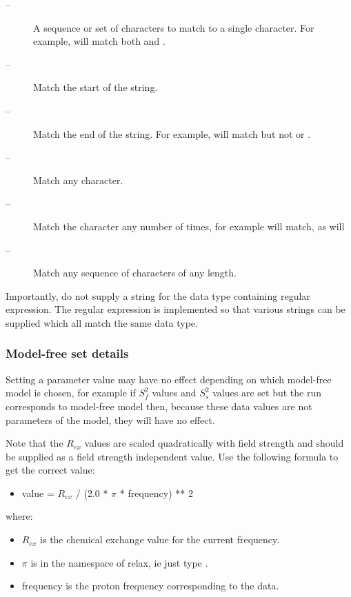 \begin{description}
\item[\quotecmd{[]} --]  A sequence or set of characters to match to a single character.  For example,  will match both  and . 
\item[\quotecmd{\^{}} --]  Match the start of the string. 
\item[\quotecmd{\$} --]  Match the end of the string.  For example,  will match  but not  or . 
\item[ --]  Match any character. 
\item[ --]  Match the character  any number of times, for example  will match, as will  
\item[ --]  Match any sequence of characters of any length. 
\end{description}


Importantly, do not supply a string for the data type containing regular expression.  The regular expression is implemented so that various strings can be supplied which all match the same data type.



\subsubsection{Model-free set details}

Setting a parameter value may have no effect depending on which model-free model is chosen, for example if $S^2_f$ values and $S^2_s$ values are set but the run corresponds to model-free model  then, because these data values are not parameters of the model, they will have no effect.


Note that the $R_{ex}$ values are scaled quadratically with field strength and should be supplied as a field strength independent value.  Use the following formula to get the correct value:


\begin{itemize}
\item[] value = $R_{ex}$ / (2.0 * $\pi$ * frequency) ** 2 
\end{itemize}


where:


\begin{itemize}
\item[] $R_{ex}$ is the chemical exchange value for the current frequency. 
\item[] $\pi$ is in the namespace of relax, ie just type \quotecmd{$\pi$}. 
\item[] frequency is the proton frequency corresponding to the data. 
\end{itemize}



